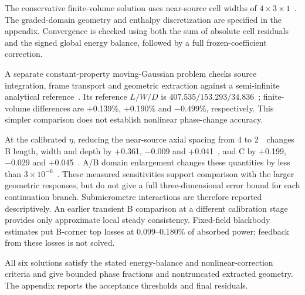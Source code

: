 The conservative finite-volume solution uses near-source cell widths of $4\times3\times1$~\um. The graded-domain geometry and enthalpy discretization are specified in the appendix. Convergence is checked using both the sum of absolute cell residuals and the signed global energy balance, followed by a full frozen-coefficient correction.

A separate constant-property moving-Gaussian problem checks source integration, frame transport and geometric extraction against a semi-infinite analytical reference~\cite{oberkampf2002}. Its reference $L/W/D$ is $407.535/153.293/34.836$~\um; finite-volume differences are +0.139\%, +0.190\% and $-0.499$\%, respectively. This simpler comparison does not establish nonlinear phase-change accuracy.

At the calibrated $\eta$, reducing the near-source axial spacing from 4 to 2~\um\ changes B length, width and depth by +0.361, $-0.009$ and +0.041~\um, and C by +0.199, $-0.029$ and +0.045~\um. A/B domain enlargement changes these quantities by less than $3\times10^{-6}$~\um. These measured sensitivities support comparison with the larger geometric responses, but do not give a full three-dimensional error bound for each continuation branch. Submicrometre interactions are therefore reported descriptively. An earlier transient B comparison at a different calibration stage provides only approximate local steady consistency. Fixed-field blackbody estimates put B-corner top losses at 0.099--0.180\% of absorbed power; feedback from these losses is not solved.

All six solutions satisfy the stated energy-balance and nonlinear-correction criteria and give bounded phase fractions and nontruncated extracted geometry. The appendix reports the acceptance thresholds and final residuals.
